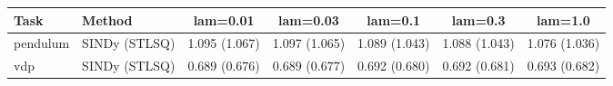 \begin{tabular}{llccccc}\toprule
Task & Method & lam=0.01 & lam=0.03 & lam=0.1 & lam=0.3 & lam=1.0 \\\midrule
pendulum & SINDy (STLSQ) & 1.095 (1.067) & 1.097 (1.065) & 1.089 (1.043) & 1.088 (1.043) & 1.076 (1.036) \\
vdp & SINDy (STLSQ) & 0.689 (0.676) & 0.689 (0.677) & 0.692 (0.680) & 0.692 (0.681) & 0.693 (0.682) \\
\bottomrule\end{tabular}
